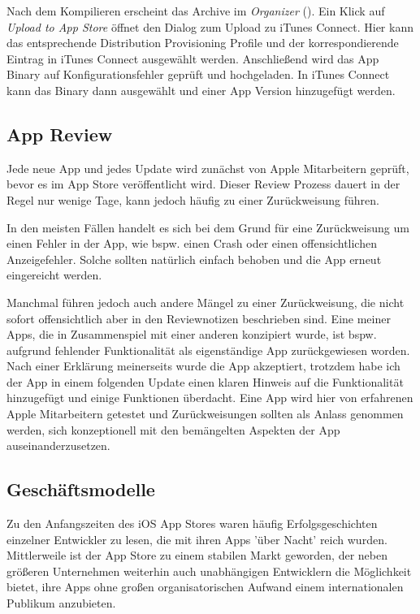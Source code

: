 \documentclass[parskip=half, final]{scrreprt}
\begin{document}
Nach dem Kompilieren erscheint das Archive im \emph{Organizer} (). Ein Klick auf \emph{Upload to App Store} öffnet den Dialog zum Upload zu iTunes Connect. Hier kann das entsprechende Distribution Provisioning Profile und der korrespondierende Eintrag in iTunes Connect ausgewählt werden. Anschließend wird das App Binary auf Konfigurationsfehler geprüft und hochgeladen. In iTunes Connect kann das Binary dann ausgewählt und einer App Version hinzugefügt werden.

\subsection{App Review}

Jede neue App und jedes Update wird zunächst von Apple Mitarbeitern geprüft, bevor es im App Store veröffentlicht wird. Dieser Review Prozess dauert in der Regel nur wenige Tage, kann jedoch häufig zu einer Zurückweisung führen.

In den meisten Fällen handelt es sich bei dem Grund für eine Zurückweisung um einen Fehler in der App, wie bspw. einen Crash oder einen offensichtlichen Anzeigefehler. Solche sollten natürlich einfach behoben und die App erneut eingereicht werden.

Manchmal führen jedoch auch andere Mängel zu einer Zurückweisung, die nicht sofort offensichtlich aber in den Reviewnotizen beschrieben sind. Eine meiner Apps, die in Zusammenspiel mit einer anderen konzipiert wurde, ist bspw. aufgrund fehlender Funktionalität als eigenständige App zurückgewiesen worden. Nach einer Erklärung meinerseits wurde die App akzeptiert, trotzdem habe ich der App in einem folgenden Update einen klaren Hinweis auf die Funktionalität hinzugefügt und einige Funktionen überdacht. Eine App wird hier von erfahrenen Apple Mitarbeitern getestet und Zurückweisungen sollten als Anlass genommen werden, sich konzeptionell mit den bemängelten Aspekten der App auseinanderzusetzen.

\subsection{Geschäftsmodelle}

Zu den Anfangszeiten des iOS App Stores waren häufig Erfolgsgeschichten einzelner Entwickler zu lesen, die mit ihren Apps 'über Nacht' reich wurden. Mittlerweile ist der App Store zu einem stabilen Markt geworden, der neben größeren Unternehmen weiterhin auch unabhängigen Entwicklern die Möglichkeit bietet, ihre Apps ohne großen organisatorischen Aufwand einem internationalen Publikum anzubieten.
\end{document}
